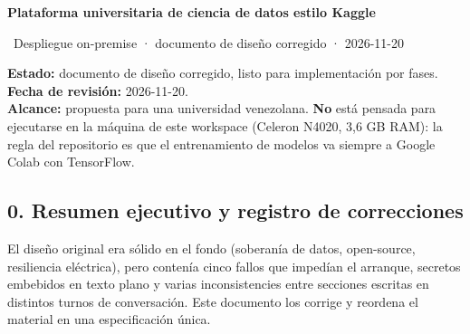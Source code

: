 \documentclass[11pt,a4paper]{article}
\newcommand{\iconoBanda}{microchip}
\newcommand{\bandaTitulo}[3][fondoOscuro]{%
  \begin{tcolorbox}[
    enhanced,
    colback=#1, colframe=#1,
    boxrule=0pt, arc=8pt, outer arc=8pt,
    width=\linewidth,
    top=18pt, bottom=6pt, left=14pt, right=14pt,
    borderline south={3.5pt}{0pt}{cyanNeon},
  ]
    \begin{minipage}[c]{0.07\linewidth}
      \centering
      \textcolor{cyanNeon}{\fontsize{30}{30}\selectfont\faIcon{\iconoBanda}}
    \end{minipage}%
    \hspace{8pt}%
    \begin{minipage}[c]{0.88\linewidth}
      {\fontsize{20}{24}\selectfont\bfseries\color{white}#2}\par\vspace{5pt}%
      \textcolor{cyanNeon!80!white}{\small\faIcon{angle-right}~#3}%
    \end{minipage}
    \vspace{4pt}
  \end{tcolorbox}%
  \vspace{8pt}%
}
\begin{document}
\bandaTitulo{Plataforma universitaria de ciencia de datos estilo Kaggle}{Despliegue on-premise · documento de diseño corregido · 2026-11-20}
\begin{tcolorbox}[cajaContenido, title=Estado del documento]
\textbf{Estado:} documento de diseño corregido, listo para implementación por fases.\\
\textbf{Fecha de revisión:} 2026-11-20.\\
\textbf{Alcance:} propuesta para una universidad venezolana. \textbf{No} está pensada para ejecutarse en la máquina de este workspace (Celeron N4020, 3,6 GB RAM): la regla del repositorio es que el entrenamiento de modelos va siempre a Google Colab con TensorFlow.
\end{tcolorbox}
\tableofcontents
\newpage

\hypertarget{0-resumen-ejecutivo-y-registro-de-correcciones}{%
\subsection{0. Resumen ejecutivo y registro de correcciones}\label{0-resumen-ejecutivo-y-registro-de-correcciones}}

El diseño original era sólido en el fondo (soberanía de datos, open-source, resiliencia eléctrica), pero contenía cinco fallos que impedían el arranque, secretos embebidos en texto plano y varias inconsistencies entre secciones escritas en distintos turnos de conversación. Este documento los corrige y reordena el material en una especificación única.
\end{document}
